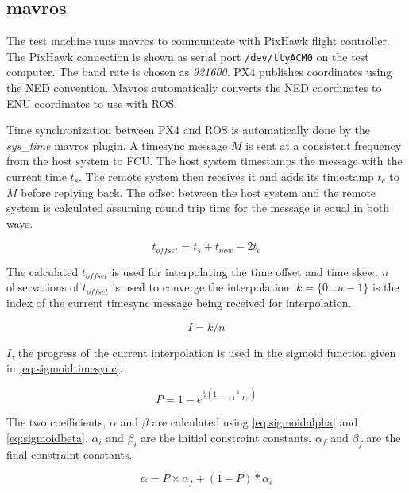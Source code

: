 \subsection{mavros}
The test machine runs mavros to communicate with PixHawk flight controller. 
The PixHawk connection is shown as serial port \texttt{/dev/ttyACM0} on the test computer. The baud rate is chosen as \textit{921600}.
PX4 publishes coordinates using the NED convention. Mavros automatically converts the NED coordinates to ENU coordinates to use with ROS.

Time synchronization between PX4 and ROS is automatically done by the \textit{sys\_time} mavros plugin.
A timesync message $M$ is sent at a consistent frequency from the host system to FCU. The host system timestamps the message with the current time $t_s$. The remote system then receives it and adds its timestamp $t_c$ to $M$ before replying back.
The offset between the host system and the remote system is calculated assuming round trip time for the message is equal in both ways.

\begin{equation}
t_{offset} = t_s + t_{now} - 2t_c
\end{equation}

The calculated $t_{offset}$ is used for interpolating the time offset and time skew. $n$ observations of $t_{offset}$ is used to converge the interpolation. $k = \{0 ... n-1\}$ is the index of the current timesync message being received for interpolation.

\begin{equation}
I = k/n
\end{equation}

$I$, the progress of the current interpolation is used in the sigmoid function given in \ref{eq:sigmoidtimesync}.

\begin{equation} \label{eq:sigmoidtimesync}
P = 1 - e^{\frac{1}{2} (1 - \frac{1}{(1 - I)})}
\end{equation}

The two coefficients, $\alpha$ and $\beta$ are calculated using \ref{eq:sigmoidalpha} and \ref{eq:sigmoidbeta}. $\alpha_i$ and $\beta_i$ are the initial constraint constants. $\alpha_f$ and $\beta_f$ are the final constraint constants.

\begin{equation} \label{eq:sigmoidalpha}
\alpha = P \times \alpha_f + (1 - P) * \alpha_i
\end{equation}

